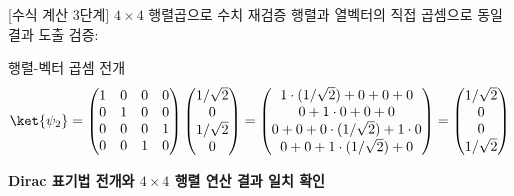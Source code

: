 \documentclass[aspectratio=169, 10pt]{beamer}
\begin{document}
\begin{frame}{[수식 계산 3단계] $4 \times 4$ 행렬곱으로 수치 재검증}
    행렬과 열벡터의 직접 곱셈으로 동일 결과 도출 검증:
    \vspace{0.2cm}
    \begin{qcblock}{행렬-벡터 곱셈 전개}
        $$\ket{\psi_2} = \begin{pmatrix}
        1 & 0 & 0 & 0 \\
        0 & 1 & 0 & 0 \\
        0 & 0 & 0 & 1 \\
        0 & 0 & 1 & 0
        \end{pmatrix}
        \begin{pmatrix}
        1/\sqrt{2} \\ 0 \\ 1/\sqrt{2} \\ 0
        \end{pmatrix}
        = \begin{pmatrix}
        1 \cdot (1/\sqrt{2}) + 0 + 0 + 0 \\
        0 + 1 \cdot 0 + 0 + 0 \\
        0 + 0 + 0 \cdot (1/\sqrt{2}) + 1 \cdot 0 \\
        0 + 0 + 1 \cdot (1/\sqrt{2}) + 0
        \end{pmatrix}
        = \begin{pmatrix}
        1/\sqrt{2} \\ 0 \\ 0 \\ 1/\sqrt{2}
        \end{pmatrix}$$
    \end{qcblock}
    \pause
    \vspace{0.2cm}
    \begin{center}
        \large \color{qcAccentBlue} \textbf{Dirac 표기법 전개와 $4 \times 4$ 행렬 연산 결과 일치 확인}
    \end{center}
\end{frame}
\end{document}
